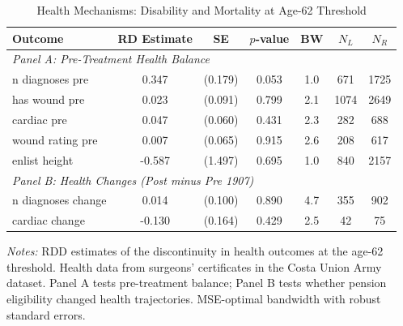 \begin{table}[htbp]
\centering
\caption{Health Mechanisms: Disability and Mortality at Age-62 Threshold}
\label{tab:health}
\begin{tabular}{lcccccc}
\toprule
  Outcome & RD Estimate & SE & $p$-value & BW & $N_L$ & $N_R$ \\
\midrule
\multicolumn{7}{l}{\textit{Panel A: Pre-Treatment Health Balance}} \\
  n diagnoses pre & 0.347 & (0.179) & 0.053 & 1.0 & 671 & 1725 \\
  has wound pre & 0.023 & (0.091) & 0.799 & 2.1 & 1074 & 2649 \\
  cardiac pre & 0.047 & (0.060) & 0.431 & 2.3 & 282 & 688 \\
  wound rating pre & 0.007 & (0.065) & 0.915 & 2.6 & 208 & 617 \\
  enlist height & -0.587 & (1.497) & 0.695 & 1.0 & 840 & 2157 \\
\midrule
\multicolumn{7}{l}{\textit{Panel B: Health Changes (Post minus Pre 1907)}} \\
  n diagnoses change & 0.014 & (0.100) & 0.890 & 4.7 & 355 & 902 \\
  cardiac change & -0.130 & (0.164) & 0.429 & 2.5 & 42 & 75 \\
\bottomrule
\end{tabular}
\begin{tablenotes}[flushleft]
\small
\item \textit{Notes:} RDD estimates of the discontinuity in health outcomes at the age-62 threshold. Health data from surgeons' certificates in the Costa Union Army dataset. Panel A tests pre-treatment balance; Panel B tests whether pension eligibility changed health trajectories. MSE-optimal bandwidth with robust standard errors.
\end{tablenotes}
\end{table}
